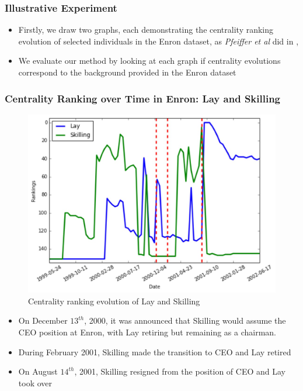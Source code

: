 \documentclass[10pt]{beamer}
\begin{document}
\begin{frame}
\frametitle{Illustrative Experiment}
\begin{itemize}
\item Firstly, we draw two graphs, each demonstrating the centrality ranking evolution of selected individuals in the Enron dataset, as \textit{Pfeiffer et al} did in \cite{pfeiffer2010probabilistic}, \cite{pfeiffer2011methods}

\item We evaluate our method by looking at each graph if centrality evolutions correspond to the background provided in the Enron dataset


\end{itemize}
\end{frame}

\begin{frame}
\frametitle{Centrality Ranking over Time in Enron: Lay and Skilling}
\begin{figure}[H]
\centering
\includegraphics[scale = 0.3]{rank_change1.png}
\caption{Centrality ranking evolution of Lay and Skilling}
\end{figure}
\vspace{-0.15in}
\begin{itemize}
\item On December $13^{th}$, 2000, it was announced that Skilling would assume the CEO position at Enron, with Lay retiring but remaining as a chairman.
\item During February 2001, Skilling made the transition to CEO and Lay retired
\item On August $14^{th}$, 2001, Skilling resigned from the position of CEO and Lay took over
\end{itemize}
\end{frame}
\end{document}
